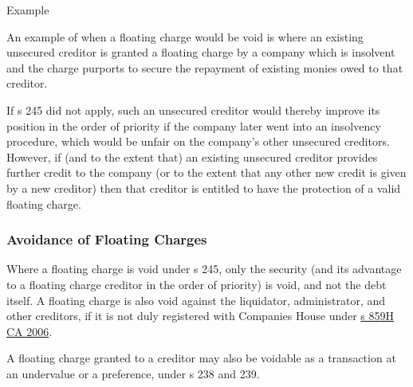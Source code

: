 \documentclass[
]{article}
\newenvironment{env-0a540a95-48c3-4466-84d1-6ddd726278e0}
{
    \savenotes\tcolorbox[blanker,breakable,left=5pt,borderline west={2pt}{-4pt}{purple}]
}
{
    \endtcolorbox\spewnotes
}
\begin{document}
\begin{env-0a540a95-48c3-4466-84d1-6ddd726278e0}

Example

An example of when a floating charge would be void is where an existing
unsecured creditor is granted a floating charge by a company which is
insolvent and the charge purports to secure the repayment of existing
monies owed to that creditor.

If s 245 did not apply, such an unsecured creditor would thereby improve
its position in the order of priority if the company later went into an
insolvency procedure, which would be unfair on the company's other
unsecured creditors. However, if (and to the extent that) an existing
unsecured creditor provides further credit to the company (or to the
extent that any other new credit is given by a new creditor) then that
creditor is entitled to have the protection of a valid floating charge.

\end{env-0a540a95-48c3-4466-84d1-6ddd726278e0}

\hypertarget{avoidance-of-floating-charges}{%
\subsubsection{Avoidance of Floating
Charges}\label{avoidance-of-floating-charges}}

Where a floating charge is void under s 245, only the security (and its
advantage to a floating charge creditor in the order of priority) is
void, and not the debt itself. A floating charge is also void against
the liquidator, administrator, and other creditors, if it is not duly
registered with Companies House under
\href{https://www.legislation.gov.uk/ukpga/2006/46/section/859H}{s 859H
CA 2006}.

A floating charge granted to a creditor may also be voidable as a
transaction at an undervalue or a preference, under s 238 and 239.
\end{document}
